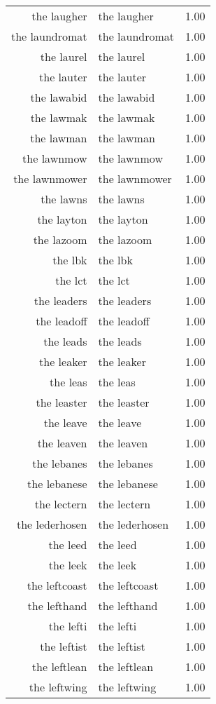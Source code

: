 \begin{table}[ht]
\begin{tabular}{rlr}
  the laugher & the laugher & 1.00 \\ 
  the laundromat & the laundromat & 1.00 \\ 
  the laurel & the laurel & 1.00 \\ 
  the lauter & the lauter & 1.00 \\ 
  the lawabid & the lawabid & 1.00 \\ 
  the lawmak & the lawmak & 1.00 \\ 
  the lawman & the lawman & 1.00 \\ 
  the lawnmow & the lawnmow & 1.00 \\ 
  the lawnmower & the lawnmower & 1.00 \\ 
  the lawns & the lawns & 1.00 \\ 
  the layton & the layton & 1.00 \\ 
  the lazoom & the lazoom & 1.00 \\ 
  the lbk & the lbk & 1.00 \\ 
  the lct & the lct & 1.00 \\ 
  the leaders & the leaders & 1.00 \\ 
  the leadoff & the leadoff & 1.00 \\ 
  the leads & the leads & 1.00 \\ 
  the leaker & the leaker & 1.00 \\ 
  the leas & the leas & 1.00 \\ 
  the leaster & the leaster & 1.00 \\ 
  the leave & the leave & 1.00 \\ 
  the leaven & the leaven & 1.00 \\ 
  the lebanes & the lebanes & 1.00 \\ 
  the lebanese & the lebanese & 1.00 \\ 
  the lectern & the lectern & 1.00 \\ 
  the lederhosen & the lederhosen & 1.00 \\ 
  the leed & the leed & 1.00 \\ 
  the leek & the leek & 1.00 \\ 
  the leftcoast & the leftcoast & 1.00 \\ 
  the lefthand & the lefthand & 1.00 \\ 
  the lefti & the lefti & 1.00 \\ 
  the leftist & the leftist & 1.00 \\ 
  the leftlean & the leftlean & 1.00 \\ 
  the leftwing & the leftwing & 1.00 \\ 

\end{tabular}
\end{table}
